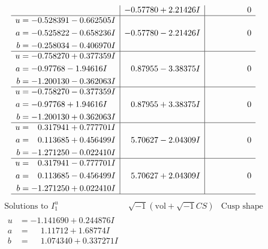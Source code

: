 \documentclass[1p]{elsarticle_modified}
\theoremstyle{definition}
\newcommand{\I}{\sqrt{-1}}
\begin{document}
$$\begin{array}{c|c|c}
 & -0.57780 + 2.21426 I & \phantom{-0.000000 } 0 \\ \hline\begin{aligned}
u &= -0.528391 - 0.662505 I \\
a &= -0.525822 - 0.658236 I \\
b &= -0.258034 - 0.406970 I\end{aligned}
 & -0.57780 - 2.21426 I & \phantom{-0.000000 } 0 \\ \hline\begin{aligned}
u &= -0.758270 + 0.377359 I \\
a &= -0.97768 - 1.94616 I \\
b &= -1.200130 - 0.362063 I\end{aligned}
 & \phantom{-}0.87955 - 3.38375 I & \phantom{-0.000000 } 0 \\ \hline\begin{aligned}
u &= -0.758270 - 0.377359 I \\
a &= -0.97768 + 1.94616 I \\
b &= -1.200130 + 0.362063 I\end{aligned}
 & \phantom{-}0.87955 + 3.38375 I & \phantom{-0.000000 } 0 \\ \hline\begin{aligned}
u &= \phantom{-}0.317941 + 0.777701 I \\
a &= \phantom{-}0.113685 + 0.456499 I \\
b &= -1.271250 - 0.022410 I\end{aligned}
 & \phantom{-}5.70627 - 2.04309 I & \phantom{-0.000000 } 0 \\ \hline\begin{aligned}
u &= \phantom{-}0.317941 - 0.777701 I \\
a &= \phantom{-}0.113685 - 0.456499 I \\
b &= -1.271250 + 0.022410 I\end{aligned}
 & \phantom{-}5.70627 + 2.04309 I & \phantom{-0.000000 } 0\\
 \hline 
 \end{array}$$\newpage$$\begin{array}{c|c|c}  
\text{Solutions to }I^u_{1}& \I (\text{vol} + \sqrt{-1}CS) & \text{Cusp shape}\\
 \hline 
\begin{aligned}
u &= -1.141690 + 0.244876 I \\
a &= \phantom{-}1.11712 + 1.68774 I \\
b &= \phantom{-}1.074340 + 0.337271 I\end{aligned}

\end{array}$$
\end{document}
